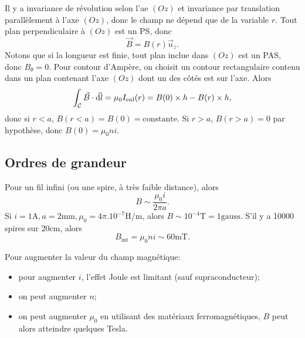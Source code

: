             Il y a invariance de révolution selon l'ae $(Oz)$ et invariance par translation parallèlement à l'axe $(Oz)$, donc le champ ne dépend que de la variable $r$. Tout plan perpendiculaire à $(Oz)$ est un PS, donc 
            \begin{equation}
                \boxed{
                    \vec{B}=B(r)\vec{u}_z.
                }
            \end{equation}
            Notons que si la longueur est finie, tout plan inclue dans $(Oz)$ est un PAS, donc $B_{\theta}=0$. Pour contour d'Ampère, on choisit un contour rectangulaire contenu dans un plan contenant l'axe $(Oz)$ dont un des côtés est sur l'axe. Alors
            \begin{equation}
                \int_{\mathcal{C}}\vec{B}\cdot\vec{\mathrm{d} l}=\mu_{0}I_{\mathrm{enl}}(r)=B(0)\times h - B(r)\times h,
            \end{equation}
            donc si $r<a$, $B(r<a)=B(0)=\mathrm{constante}$. Si $r>a$, $B(r>a)=0$ par hypothèse, donc $B(0)=\mu_0 n i$.

    \subsection{Ordres de grandeur}

        Pour un fil infini (ou une spire, à très faible distance), alors 
        \begin{equation}
            B\sim\frac{\mu_0 i}{2\pi a}.
        \end{equation}
        Si $i=1\si{\ampere},a=2\si{\milli\metre},\mu_0=4\pi.10^{-7}\si{\henry\per\metre}$, alors $B\sim 10^{-4}\si{\tesla}=1\mathrm{gauss}$.
        S'il y a 10000 spires sur 20\si{\centi\metre}, alors 
        \begin{equation}
            B_{\mathrm{int}}=\mu_0 n i\sim 60\si{\milli\tesla}.
        \end{equation}

        Pour augmenter la valeur du champ magnétique:
        \begin{itemize}
            \item pour augmenter $i$, l'effet Joule est limitant (sauf supraconducteur);
            \item on peut augmenter $n$;
            \item on peut augmenter $\mu_0$ en utilisant des matériaux ferromagnétiques, $B$ peut alors atteindre quelques Tesla.
        \end{itemize}

